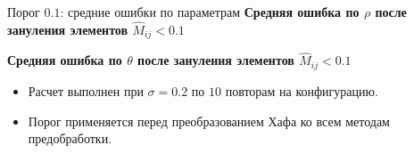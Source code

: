 \documentclass[unicode,notheorems]{beamer}
\begin{document}
\begin{frame}{Порог $0.1$: средние ошибки по параметрам}
	\scriptsize
	\centering
	\textbf{Средняя ошибка по $\rho$ после зануления элементов $\widehat M_{ij}<0.1$}
	\par\vspace{0.06cm}
	{
	\renewcommand{\arraystretch}{0.9}
	\setlength{\tabcolsep}{2pt}
	\resizebox{\textwidth}{!}{}
	}

	\vspace{0.18cm}
	\textbf{Средняя ошибка по $\theta$ после зануления элементов $\widehat M_{ij}<0.1$}
	\par\vspace{0.06cm}
	{
	\renewcommand{\arraystretch}{0.9}
	\setlength{\tabcolsep}{2pt}
	\resizebox{\textwidth}{!}{}
	}

	\vspace{0.12cm}
	\begin{itemize}
		\setlength{\itemsep}{0pt}
		\item Расчет выполнен при $\sigma=0.2$ по $10$ повторам на конфигурацию.
		\item Порог применяется перед преобразованием Хафа ко всем методам предобработки.
	\end{itemize}
\end{frame}
\end{document}
